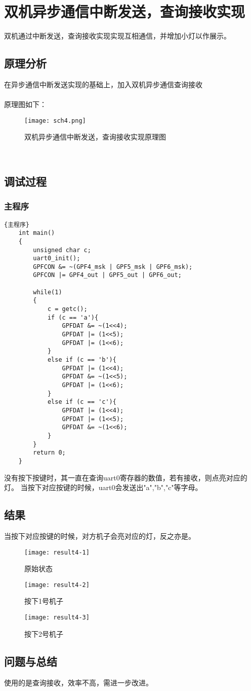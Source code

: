 \section{双机异步通信中断发送，查询接收实现}
双机通过中断发送，查询接收实现实现互相通信，并增加小灯以作展示。
\subsection{原理分析}
在异步通信中断发送实现的基础上，加入双机异步通信查询接收\\
\\
原理图如下：\\
\begin{figure}[htbp]
  \centering
  \texttt{[image: sch4.png]}
  \caption{双机异步通信中断发送，查询接收实现原理图}
\end{figure}
\\
\subsection{调试过程}
\subsubsection{主程序}
\lstset{language=C}
\begin{lstlisting}{主程序}
    int main()
    {
        unsigned char c;
        uart0_init();  
        GPFCON &= ~(GPF4_msk | GPF5_msk | GPF6_msk);
        GPFCON |= GPF4_out | GPF5_out | GPF6_out;
    
        while(1)
        {
            c = getc();
            if (c == 'a'){
                GPFDAT &= ~(1<<4);
                GPFDAT |= (1<<5);
                GPFDAT |= (1<<6);
            } 
            else if (c == 'b'){
                GPFDAT |= (1<<4);
                GPFDAT &= ~(1<<5);
                GPFDAT |= (1<<6);
            }
            else if (c == 'c'){
                GPFDAT |= (1<<4);
                GPFDAT |= (1<<5);
                GPFDAT &= ~(1<<6);
            }
        }
        return 0;
    }
\end{lstlisting}
没有按下按键时，其一直在查询uart0寄存器的数值，若有接收，则点亮对应的灯。
当按下对应按键的时候，uart0会发送出"a","b","c"等字母。


\subsection{结果}
当按下对应按键的时候，对方机子会亮对应的灯，反之亦是。
\begin{figure}[htbp]
    \centering
    \texttt{[image: result4-1]}
    \caption{原始状态}
\end{figure}

\begin{figure}[htbp]
    \centering
    \texttt{[image: result4-2]}
    \caption{按下1号机子}
\end{figure}

\begin{figure}[htbp]
    \centering
    \texttt{[image: result4-3]}
    \caption{按下2号机子}
\end{figure}
\subsection{问题与总结}
使用的是查询接收，效率不高，需进一步改进。